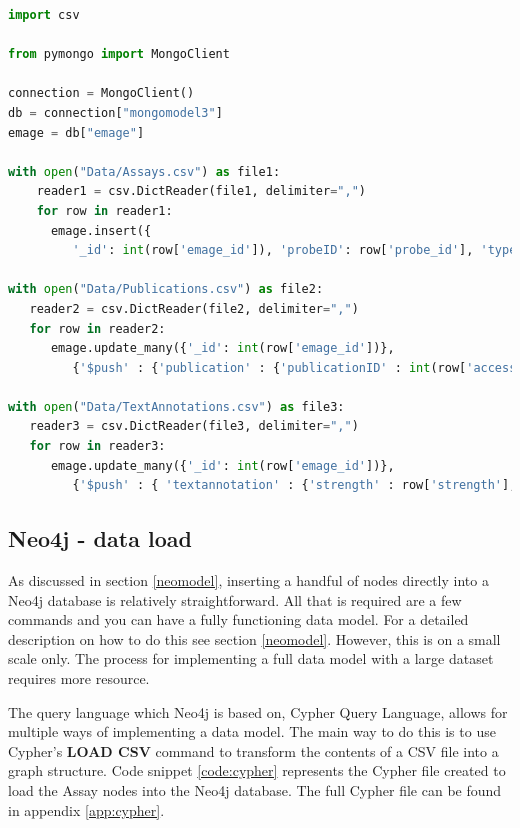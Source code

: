 \begin{lstlisting}[language=Python, caption=PyMongo script implemented to load data into MongoDB., label=code:pymongo]
import csv

from pymongo import MongoClient

connection = MongoClient()
db = connection["mongomodel3"]
emage = db["emage"]

with open("Data/Assays.csv") as file1:
    reader1 = csv.DictReader(file1, delimiter=",")
    for row in reader1:
      emage.insert({
         '_id': int(row['emage_id']), 'probeID': row['probe_id'], 'type': row['assay_type'], 'source': row['name'], 'specimen' : {'type':row['type'],'strain' : row['strain']}, 'stage' : {'theilerstage' : int(row['theilerstage']),'dpc' : row['dpc']}})
         
with open("Data/Publications.csv") as file2:
   reader2 = csv.DictReader(file2, delimiter=",")
   for row in reader2:
      emage.update_many({'_id': int(row['emage_id'])},
         {'$push' : {'publication' : {'publicationID' : int(row['accession']), 'title' : row['title'], 'author' : row['author']}}}, upsert=False)
         
with open("Data/TextAnnotations.csv") as file3:
   reader3 = csv.DictReader(file3, delimiter=",")
   for row in reader3:
      emage.update_many({'_id': int(row['emage_id'])},
         {'$push' : { 'textannotation' : {'strength' : row['strength'], 'anatomystructure' : {'structureID' : int(row['EMAPA']),'term' : row['term']}, 'gene' : {'geneID' : row['accession'],'name' : row['name']}}}}, upsert=False)
\end{lstlisting}
\vspace*{\fill}
\newpage
\subsection{Neo4j - data load}
As discussed in section \ref{neomodel}, inserting a handful of nodes directly into a Neo4j database is relatively straightforward. All that is required are a few commands and you can have a fully functioning data model. For a detailed description on how to do this see section \ref{neomodel}. However, this is on a small scale only. The process for implementing a full data model with a large dataset requires more resource.

The query language which Neo4j is based on, Cypher Query Language, allows for multiple ways of implementing a data model. The main way to do this is to use Cypher's \textbf{LOAD CSV} command to transform the contents of a CSV file into a graph structure. Code snippet \ref{code:cypher} represents the Cypher file created to load the Assay nodes into the Neo4j database. The full Cypher file can be found in appendix \ref{app:cypher}.

